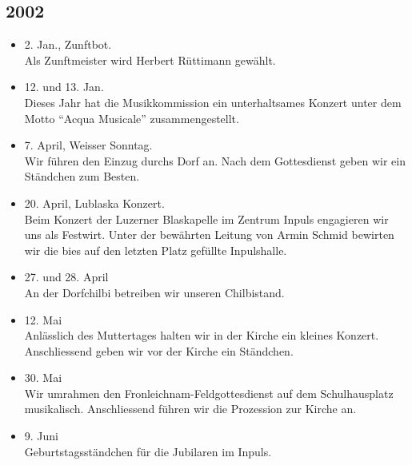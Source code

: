 \subsection*{2002}

\begin{history}

    \begin{itemize}

        \item 2. Jan., Zunftbot.\\
              Als Zunftmeister wird Herbert Rüttimann gewählt.

        \item 12. und 13. Jan.\\
              Dieses Jahr hat die Musikkommission ein unterhaltsames Konzert unter dem
              Motto \enquote{Acqua Musicale} zusammengestellt.

        \item 7. April, Weisser Sonntag. \\
              Wir führen den Einzug durchs Dorf an. Nach dem
              Gottesdienst geben wir ein Ständchen zum Besten.

        \item 20. April, Lublaska Konzert.\\
              Beim Konzert der Luzerner Blaskapelle im Zentrum
              Inpuls engagieren wir uns als Festwirt. Unter der bewährten Leitung von
              Armin Schmid bewirten wir die bies auf den letzten Platz gefüllte
              Inpulshalle.

        \item 27. und 28. April\\
              An der Dorfchilbi betreiben wir unseren Chilbistand.

        \item 12. Mai\\
              Anlässlich des Muttertages halten wir in der Kirche ein kleines Konzert.
              Anschliessend geben wir vor der Kirche ein Ständchen.

        \item 30. Mai\\
              Wir umrahmen den Fronleichnam-Feldgottesdienst auf dem Schulhausplatz
              musikalisch. Anschliessend führen wir die Prozession zur Kirche an.

        \item 9. Juni\\
              Geburtstagsständchen für die Jubilaren im Inpuls.


\end{itemize}
\end{history}

